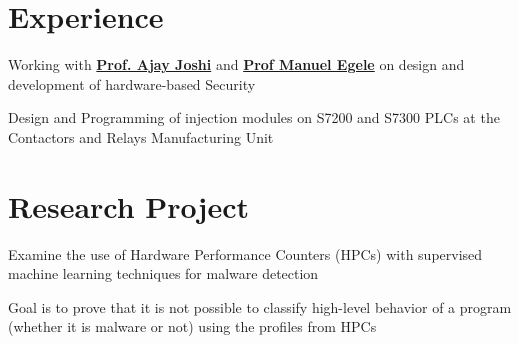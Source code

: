 \documentclass[]{deedy_format_Anmol}
\begin{document}
\hfill
\begin{minipage}[t]{0.66\textwidth} 
%
%



\section{Experience}
\vspace{0.5mm} %
\vspace{\topsep} %
\vspace{1mm}
\justify
\begin{tightemize}
\item Working with \textbf{\href{https://www.bu.edu/eng/profile/ajay-joshi/}{Prof. Ajay Joshi}} and \textbf{\href{https://www.bu.edu/eng/profile/manuel-egele/}{Prof Manuel Egele}} on design and development of hardware-based Security
\end{tightemize}
\vspace{\topsep}
\sectionsep

\vspace{1mm}
\justify
\begin{tightemize}
\item Design and Programming of injection modules on S7200 and S7300 PLCs at the Contactors and Relays Manufacturing Unit
\end{tightemize}
\vspace{\topsep}
\sectionsep


\section{Research Project}
\vspace{0.5mm} %
\vspace{1mm}
\justify
\begin{tightemize}
\item Examine the use of Hardware Performance Counters (HPCs) with supervised machine learning techniques for malware detection 
\item Goal is to prove that it is not possible to classify high-level behavior of a program (whether it is malware or not) using the profiles from HPCs
\end{tightemize}
\sectionsep



\end{minipage}
\end{document}
